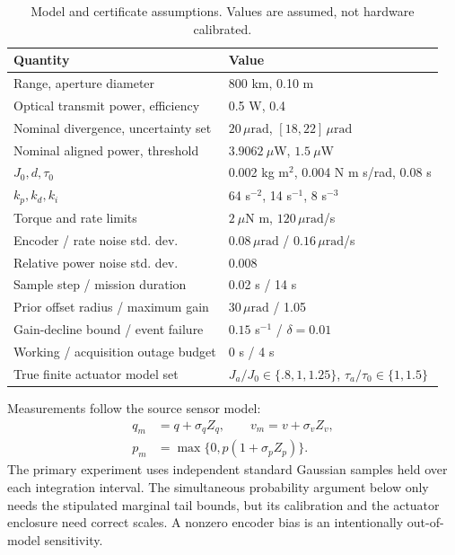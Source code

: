 \documentclass[10pt,journal]{IEEEtran}
\newcommand{\um}{\,\mu\mathrm{rad}}
\begin{document}
\begin{table}[t]
\caption{Model and certificate assumptions. Values are assumed, not hardware calibrated.}
\centering\footnotesize
\begin{tabular}{@{}p{}p{}@{}}\toprule
Quantity & Value\\\midrule
Range, aperture diameter & 800 km, 0.10 m\\
Optical transmit power, efficiency & 0.5 W, 0.4\\
Nominal divergence, uncertainty set & $20\um$, $[18,22]\um$\\
Nominal aligned power, threshold & $3.9062~\mu$W, $1.5~\mu$W\\
$J_0,d,\tau_0$ & 0.002 kg m$^2$, 0.004 N m s/rad, 0.08 s\\
$k_p,k_d,k_i$ & 64 s$^{-2}$, 14 s$^{-1}$, 8 s$^{-3}$\\
Torque and rate limits & $2~\mu$N m, $120\um$/s\\
Encoder / rate noise std. dev. & $0.08\um$ / $0.16\um$/s\\
Relative power noise std. dev. & 0.008\\
Sample step / mission duration & 0.02 s / 14 s\\
Prior offset radius / maximum gain & $30\um$ / 1.05\\
Gain-decline bound / event failure & $0.15$ s$^{-1}$ / $\delta=0.01$\\
Working / acquisition outage budget & 0 s / 4 s\\
True finite actuator model set & $J_a/J_0\in\{.8,1,1.25\}$, $\tau_a/\tau_0\in\{1,1.5\}$\\\bottomrule
\end{tabular}
\label{tab:parameters}
\end{table}

Measurements follow the source sensor model:
\begin{align}
 q_m&=q+\sigma_q Z_q,\qquad v_m=v+\sigma_v Z_v,\nonumber\\
 p_m&=\max\{0,p(1+\sigma_p Z_p)\}.
\end{align}
The primary experiment uses independent standard Gaussian samples held over each integration interval. The simultaneous probability argument below only needs the stipulated marginal tail bounds, but its calibration and the actuator enclosure need correct scales. A nonzero encoder bias is an intentionally out-of-model sensitivity.
\end{document}
